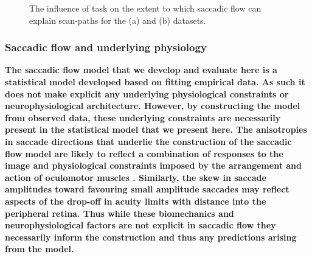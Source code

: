 \documentclass[a4paper, twocolumn, oneside, 11pt]{article}
\begin{document}
\begin{figure}
\centering
\caption{The influence of task on the extent to which saccadic flow can explain scan-paths for the (a) \cite{koehler2014} and (b) \cite{mills2011} datasets.}
\label{fig:taskLLH}
\end{figure}

\subsubsection{Saccadic flow and underlying physiology}
\textbf{The saccadic flow model that we develop and evaluate here is a statistical model developed based on fitting empirical data. As such it does not make explicit any underlying physiological constraints or neurophysiological architecture. However, by constructing the model from observed data, these underlying constraints are necessarily present in the statistical model that we present here. The anisotropies in saccade directions that underlie the construction of the saccadic flow model are likely to reflect a combination of responses to the image and physiological constraints imposed by the arrangement and action of oculomotor muscles \cite{smit1987parametric,viviani1977curvature}. Similarly, the skew in saccade amplitudes toward favouring small amplitude saccades may reflect aspects of the drop-off in acuity limits with distance into the peripheral retina. Thus while these biomechanics and neurophysiological factors are not explicit in saccadic flow they necessarily inform the construction and thus any predictions arising from the model.}
\end{document}
